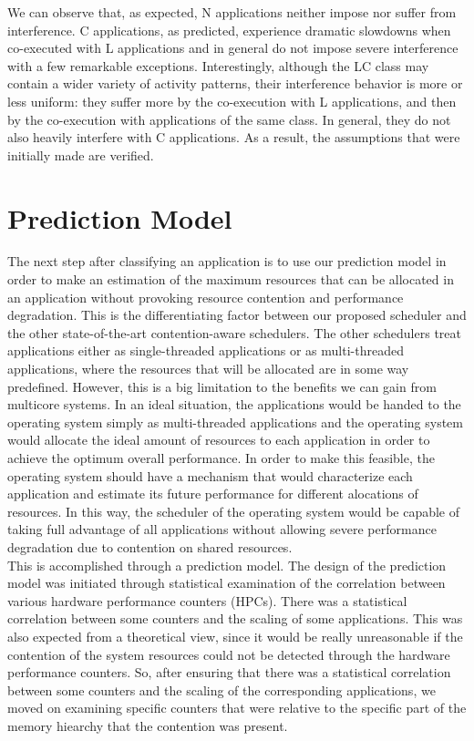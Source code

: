 \documentclass[diploma]{Styles/softlab-thesis}
\begin{document}
We can observe that, as expected, N applications neither impose nor suffer from interference. C applications, as predicted, experience dramatic slowdowns when co-executed with L applications and in general do not impose severe interference with a few remarkable exceptions. Interestingly, although the LC class may contain a wider variety of activity patterns, their interference behavior is more or less uniform: they suffer more by the co-execution with L applications, and then by the co-execution with applications of the same class. In general, they do not also heavily interfere with C applications. As a result, the assumptions that were initially made are verified.


\chapter{Prediction Model}

The next step after classifying an application is to use our prediction model in order to make an estimation of the maximum resources that can be allocated in an application without provoking resource contention and performance degradation. This is the differentiating factor between our proposed scheduler and the other state-of-the-art contention-aware schedulers. The other schedulers treat applications either as single-threaded applications or as multi-threaded applications, where the resources that will be allocated are in some way predefined. However, this is a big limitation to the benefits we can gain from multicore systems. In an ideal situation, the applications would be handed to the operating system simply as multi-threaded applications and the operating system would allocate the ideal amount of resources to each application in order to achieve the optimum overall performance. In order to make this feasible, the operating system should have a mechanism that would characterize each application and estimate its future performance for different alocations of resources. In this way, the scheduler of the operating system would be capable of taking full advantage of all applications without allowing severe performance degradation due to contention on shared resources. \\ 

This is accomplished through a prediction model. The design of the prediction model was initiated through statistical examination of the correlation between various hardware performance counters (HPCs). There was a statistical correlation between some counters and the scaling of some applications. This was also expected from a theoretical view, since it would be really unreasonable if the contention of the system resources could not be detected through the hardware performance counters. So, after ensuring that there was a statistical correlation between some counters and the scaling of the corresponding applications, we moved on examining specific counters that were relative to the specific part of the memory hiearchy that the contention was present. \\
\end{document}
